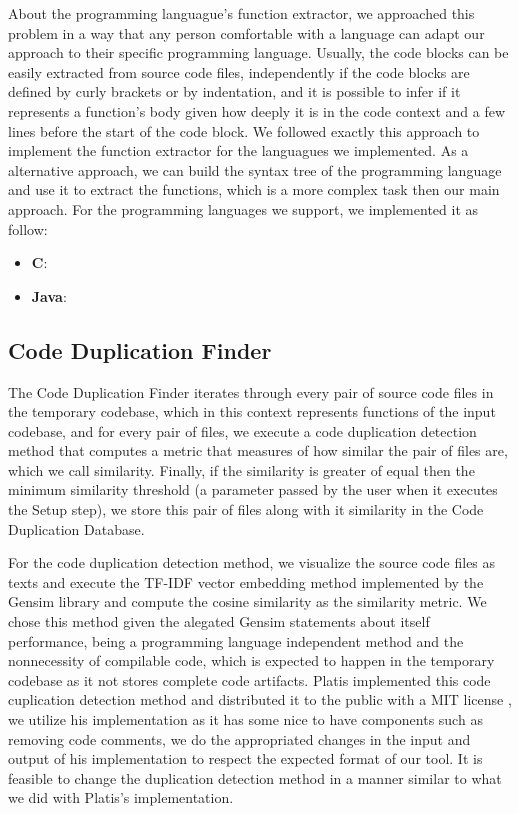 About the programming languague's function extractor, we approached this problem in a way that any person comfortable with a language
can adapt our approach to their specific programming language. Usually, the code blocks can be easily extracted from 
source code files, independently if the code blocks are defined by curly brackets or by indentation, and it is possible to
infer if it represents a function's body given how deeply it is in the code context and a few lines before the start 
of the code block. We followed exactly this approach to implement the function extractor for the languagues we implemented. 
As a alternative approach, we can build the syntax tree \citep{compiler} of the programming language and use it to 
extract the functions, which is a more complex task then our main approach. For the programming languages we support, we implemented
it as follow:

\begin{itemize}
  \item \textbf{C}:
  \item \textbf{Java}:
\end{itemize}


\subsection{Code Duplication Finder}

The Code Duplication Finder iterates through every pair of source code files in the temporary codebase, which in this context represents
functions of the input codebase, and for every pair of files, we execute a code duplication detection method that computes a metric
that measures of how similar the pair of files are, which we call similarity. Finally, if the similarity is greater of equal then the
minimum similarity threshold (a parameter passed by the user when it executes the Setup step), we store this pair of files along with
it similarity in the Code Duplication Database.

For the code duplication detection method, we visualize the source code files as texts and execute the TF-IDF vector embedding method
implemented by the Gensim library \citep{gensim} and compute the cosine similarity as the similarity metric. We chose this method 
given the alegated Gensim statements about itself performance, being a programming language independent method and the nonnecessity of 
compilable code, which is expected to happen in the temporary codebase as it not stores complete code artifacts. Platis implemented
this code cuplication detection method and distributed it to the public with a MIT license \citep{platistool} \citep{mitlicense}, 
we utilize his implementation as it has some nice to have components such as removing code comments, we do the appropriated changes
in the input and output of his implementation to respect the expected format of our tool. 
It is feasible to change the duplication detection method in a manner similar to what we did with Platis's implementation.

